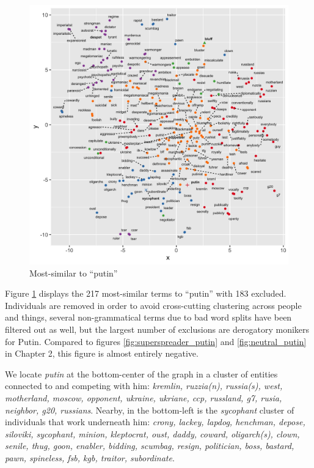 \documentclass[doublespacing]{utdthesis}
\begin{document}
\begin{figure}[!ht]
\centering
\includegraphics[width=\textwidth]{2022/putin}
\caption{Most-similar to ``putin''}
\label{fig:putin_2022}
\end{figure}

Figure \ref{fig:putin_2022} displays the 217 most-similar terms to ``putin'' with 183 excluded.
Individuals are removed in order to avoid cross-cutting clustering across people and things, several non-grammatical terms due to bad word splits have been filtered out as well, but the largest number of exclusions are derogatory monikers for Putin.
Compared to figures \ref{fig:superspreader_putin} and \ref{fig:neutral_putin} in Chapter 2, this figure is almost entirely negative.

We locate \emph{putin} at the bottom-center of the graph in a cluster of entities connected to and competing with him: \emph{kremlin, ruzzia(n), russia(s), west, motherland, moscow, opponent, ukraine, ukriane, ccp, russland, g7, rusia, neighbor, g20, russians}.
Nearby, in the bottom-left is the \emph{sycophant} cluster of individuals that work underneath him: \emph{crony, lackey, lapdog, henchman, depose, siloviki, sycophant, minion, kleptocrat, oust, daddy, coward, oligarch(s), clown, senile, thug, goon, enabler, bidding, scumbag, resign, politician, boss, bastard, pawn, spineless, fsb, kgb, traitor, subordinate}.
\end{document}
